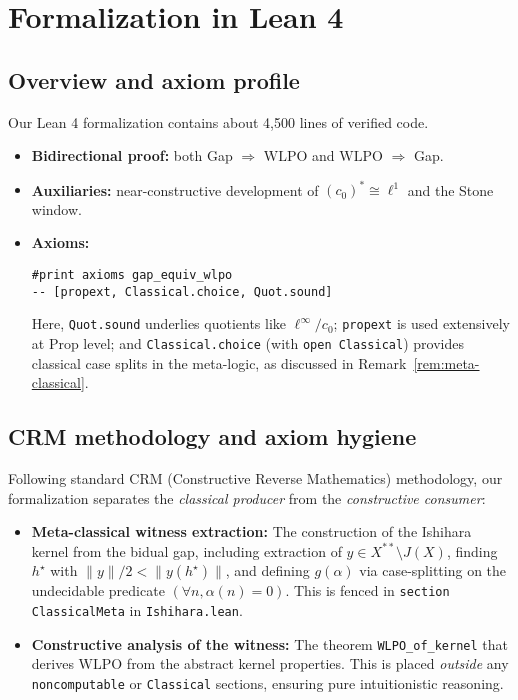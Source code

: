 \documentclass[11pt]{article}
\newcommand{\linf}{\ell^\infty}
\newcommand{\cnull}{c_0}
\newcommand{\WLPO}{\mathrm{WLPO}}
\begin{document}
\section{Formalization in Lean 4}\label{sec:lean}

\subsection{Overview and axiom profile}\label{sec:axioms}

Our Lean 4 formalization contains about 4{,}500 lines of verified code.
\begin{itemize}
\item \textbf{Bidirectional proof:} both Gap $\Rightarrow$ $\WLPO$ and $\WLPO$ $\Rightarrow$ Gap.
\item \textbf{Auxiliaries:} near-constructive development of $(\cnull)^*\cong \ell^1$ and the Stone window.
\item \textbf{Axioms:}
\begin{lstlisting}[language=Lean,numbers=none]
#print axioms gap_equiv_wlpo
-- [propext, Classical.choice, Quot.sound]
\end{lstlisting}
Here, \texttt{Quot.sound} underlies quotients like $\linf/\cnull$; \texttt{propext} is used extensively at Prop level; and \texttt{Classical.choice} (with \texttt{open Classical}) provides classical case splits in the meta-logic, as discussed in Remark~\ref{rem:meta-classical}.
\end{itemize}

\subsection{CRM methodology and axiom hygiene}\label{sec:crm-hygiene}

Following standard CRM (Constructive Reverse Mathematics) methodology, our formalization 
separates the \emph{classical producer} from the \emph{constructive consumer}:

\begin{itemize}
\item \textbf{Meta-classical witness extraction:} The construction of the Ishihara kernel from the bidual gap,
  including extraction of $y \in X^{**} \setminus J(X)$, finding $h^\star$ with $\|y\|/2 < \|y(h^\star)\|$,
  and defining $g(\alpha)$ via case-splitting on the undecidable predicate $(\forall n, \alpha(n) = 0)$.
  This is fenced in \texttt{section ClassicalMeta} in \texttt{Ishihara.lean}.

\item \textbf{Constructive analysis of the witness:} The theorem \texttt{WLPO\_of\_kernel} that derives $\WLPO$ 
  from the abstract kernel properties. This is placed \emph{outside} any \texttt{noncomputable} or 
  \texttt{Classical} sections, ensuring pure intuitionistic reasoning.
\end{itemize}
\end{document}

